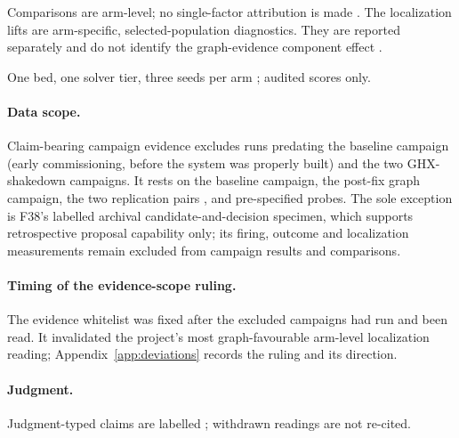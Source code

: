 Comparisons are arm-level; no single-factor attribution is made .
The localization lifts are arm-specific, selected-population diagnostics.
They are reported separately and do not identify the graph-evidence
component effect .

One bed, one solver tier, three seeds per arm ; audited scores
only.

\paragraph{Data scope.} Claim-bearing campaign evidence excludes runs
predating the baseline campaign (early commissioning, before the system was
properly built) and the two GHX-shakedown campaigns. It rests on the baseline
campaign, the post-fix graph campaign, the two replication pairs
, and pre-specified probes. The sole exception is F38's labelled
archival candidate-and-decision specimen, which supports retrospective
proposal capability only; its firing, outcome and localization measurements
remain excluded from campaign results and comparisons.

\paragraph{Timing of the evidence-scope ruling.} The evidence whitelist was
fixed after the excluded campaigns had run and been read. It invalidated the
project's most graph-favourable arm-level localization reading;
Appendix~\ref{app:deviations} records the ruling and its direction.

\paragraph{Judgment.} Judgment-typed claims are labelled ; withdrawn
readings are not re-cited.

